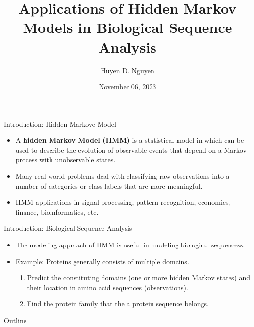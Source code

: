 \documentclass{beamer}
\title[University of Connecticut] {Applications of Hidden Markov Models in Biological Sequence Analysis}
\author{Huyen D. Nguyen}
\institute[]{University of Connecticut \\
	\medskip
	\text{Department of Statistics}\\
}
\date{November 06, 2023}
\begin{document}
\begin{frame}
	\titlepage
\end{frame}

\begin{frame}{Introduction: Hidden Markove Model}
	\begin{itemize}
		\item A \textbf{hidden Markov Model (HMM)} is a statistical model in which can be used to describe the evolution of observable events that depend on a Markov process with unobservable states. 
		\item Many real world problems deal with classifying raw observations into a number of categories or class labels that are more meaningful.
		\item HMM applications in signal processing, pattern recognition, economics, finance, bioinformatics, etc.
	\end{itemize}
\end{frame}

\begin{frame}{Introduction: Biological Sequence Analysis}
	\begin{itemize}
		\item The modeling approach of HMM is useful in modeling biological sequencess.
		\item Example: Proteins generally consists of multiple domains. 
		\begin{enumerate}
			\item Predict the constituting domains (one or more hidden Markov states) and their location in amino acid sequences (observations).
			\item Find the protein family that the a protein sequence belongs.
		\end{enumerate}
	\end{itemize}
\end{frame}

\begin{frame}{Outline}
	\tableofcontents
\end{frame}
\end{document}
